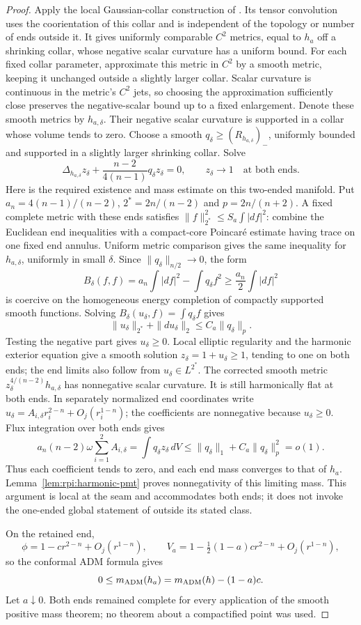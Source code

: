 \begin{proof}
Apply the local Gaussian-collar construction of
\cite[Section~3, Proposition~3.1 and Equation~(36)]{Miao2002}.
Its tensor convolution uses the coorientation of this collar and
is independent of the topology or number of ends outside it.
It gives uniformly comparable $C^2$ metrics, equal to $h_a$ off
a shrinking collar, whose negative scalar curvature has a uniform
bound. For each fixed collar parameter, approximate this metric
in $C^2$ by a smooth metric, keeping it unchanged outside a slightly
larger collar. Scalar curvature is continuous in the metric's
$C^2$ jets, so choosing the approximation sufficiently close
preserves the negative-scalar bound up to a fixed enlargement.
Denote these smooth metrics by $h_{a,\delta}$.
Their negative scalar curvature is supported in a collar whose
volume tends to zero. Choose a smooth
$q_\delta\ge(R_{h_{a,\delta}})_-$, uniformly bounded and supported in
a slightly larger shrinking collar. Solve
\[
 \Delta_{h_{a,\delta}} z_\delta+
       \frac{n-2}{4(n-1)}q_\delta z_\delta=0,
 \qquad z_\delta\longrightarrow1\quad\text{at both ends}.
\]
Here is the required existence and mass estimate on this two-ended
manifold. Put $a_n=4(n-1)/(n-2)$, $2^*=2n/(n-2)$ and
$p=2n/(n+2)$. A fixed complete metric with these ends satisfies
$\|f\|_{2^*}^2\le S_a\int|df|^2$: combine the Euclidean end
inequalities with a compact-core Poincar\'e estimate having trace on
one fixed end annulus. Uniform metric comparison gives the same
inequality for $h_{a,\delta}$, uniformly in small $\delta$.
Since $\|q_\delta\|_{n/2}\to0$, the form
\[
 B_\delta(f,f)=a_n\int|df|^2-\int q_\delta f^2
       \ge\frac{a_n}{2}\int|df|^2
\]
is coercive on the homogeneous energy completion of compactly
supported smooth functions. Solving
$B_\delta(u_\delta,f)=\int q_\delta f$ gives
\[
 \|u_\delta\|_{2^*}+\|du_\delta\|_2
       \le C_a\|q_\delta\|_p.
\]
Testing the negative part gives $u_\delta\ge0$. Local elliptic
regularity and the harmonic exterior equation give a smooth solution
$z_\delta=1+u_\delta\ge1$, tending to one on both ends; the end
limits also follow from $u_\delta\in L^{2^*}$.
The corrected smooth metric
$z_\delta^{4/(n-2)}h_{a,\delta}$ has nonnegative scalar curvature.
It is still harmonically flat at both ends. In separately normalized
end coordinates write
$u_\delta=A_{i,\delta}r_i^{2-n}+O_j(r_i^{1-n})$;
the coefficients are nonnegative because $u_\delta\ge0$.
Flux integration over both ends gives
\[
 a_n(n-2)\omega\sum_{i=1}^2A_{i,\delta}
   =\int q_\delta z_\delta\,dV
   \le\|q_\delta\|_1+C_a\|q_\delta\|_p^2=o(1).
\]
Thus each coefficient tends to zero, and each end mass converges to
that of $h_a$.
Lemma~\ref{lem:rpi:harmonic-pmt} proves nonnegativity of this limiting
mass. This argument is local at the seam and accommodates both ends;
it does not invoke the one-ended global statement of
\cite[Theorem~1]{Miao2002} outside its stated class.

On the retained end,
\[
 \phi=1-cr^{2-n}+O_j(r^{1-n}),\qquad
 V_a=1-\tfrac12(1-a)cr^{2-n}+O_j(r^{1-n}),
\]
so the conformal ADM formula gives
\[
 0\le m_{\rm ADM}(h_a)=m_{\rm ADM}(h)-(1-a)c.
\]
Let $a\downarrow0$. Both ends remained complete for every application
of the smooth positive mass theorem; no theorem about a compactified
point was used.
\end{proof}

